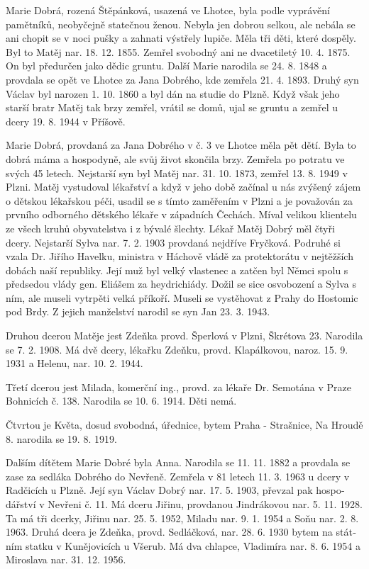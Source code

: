 \documentclass[../dejiny-rodu-prusiku.tex]{subfiles}
\begin{document}
Marie Dobrá, rozená Štěpánková, usazená ve Lhotce, byla podle vyprávění pamětníků, neobyčejně statečnou ženou. Nebyla jen dobrou selkou, ale nebála se ani chopit se v noci pušky a zahnati výstřely lupiče. Měla tři děti, které dospěly. Byl to Matěj nar. 18. 12. 1855. Zemřel svobodný ani ne dvacetiletý 10. 4. 1875. On byl předurčen jako dědic gruntu. Další Marie narodila se 24. 8. 1848 a provdala se opět ve Lhotce za Jana Dobrého, kde zemřela 21. 4. 1893. Druhý syn Václav byl narozen 1. 10. 1860 a byl dán na studie do Plzně. Když však jeho starší bratr Matěj tak brzy zemřel, vrátil se domů, ujal se gruntu a zemřel u dcery 19. 8. 1944 v Příšově.

Marie Dobrá, provdaná za Jana Dobrého v č. 3 ve Lhotce měla pět dětí. Byla to dobrá máma a hospodyně, ale svůj život skončila brzy. Zemřela po potratu ve svých 45 letech. Nejstarší syn byl Matěj nar. 31. 10. 1873, zemřel 13. 8. 1949 v Plzni. Matěj vystudoval lékařství a když v jeho době začínal u nás zvýšený zájem o dětskou lékařskou péči, usadil se s tímto zaměřením v Plzni a je považován za prvního odborného dětského lékaře v západních Čechách. Míval velikou klientelu ze všech kruhů obyvatelstva i z bývalé šlechty. Lékař Matěj Dobrý měl čtyři dcery. Nejstarší Sylva nar. 7. 2. 1903 provdaná nejdříve Fryčková. Podruhé si vzala Dr. Jiřího Havelku, ministra v Háchově vládě za protektorátu v nejtěžších dobách naší republiky. Její muž byl velký vlastenec a zatčen byl Němci spolu s předsedou vlády gen. Eliášem za heydrichiády. Dožil se sice osvobození a Sylva s ním, ale museli vytrpěti vel­ká příkoří. Museli se vystěhovat z Prahy do Hostomic pod Brdy. Z jejich manželství narodil se syn Jan 23. 3. 1943.

Druhou dcerou Matěje jest Zdeňka provd. Šperlová v Plzni, Škrétova 23. Narodila se 7. 2. 1908. Má dvě dcery, lékařku Zdeňku, provd. Klapálkovou, naroz. 15. 9. 1931 a Helenu, nar. 10. 2. 1944.

Třetí dcerou jest Milada, komerční ing., provd. za lékaře Dr. Semotána v Praze Bohnicích č. 138. Narodila se 10. 6. 1914. Děti nemá.

Čtvrtou je Květa, dosud svobodná, úřednice, bytem Praha - Strašnice, Na Hroudě 8. narodila se 19. 8. 1919.

Dalším dítětem Marie Dobré byla Anna. Narodila se 11. 11. 1882 a provdala se zase za sedláka Dobrého do Nevřeně. Zemřela v 81 letech 11. 3. 1963 u dcery v Radčicích u Plzně. Její syn Václav Dobrý nar. 17. 5. 1903, převzal pak hospo­dářství v Nevřeni č. 11. Má dceru Jiřinu, provdanou Jindrákovou nar. 5. 11. 1928. Ta má tři dcerky, Jiřinu nar. 25. 5. 1952, Miladu nar. 9. 1. 1954 a Soňu nar. 2. 8. 1963. Druhá dcera je Zdeňka, provd. Sedláčková, nar. 28. 6. 1930 bytem na stát­ním statku v Kunějovicích u Všerub. Má dva chlapce, Vladimíra nar. 8. 6. 1954 a Miroslava nar. 31. 12. 1956.
\end{document}
